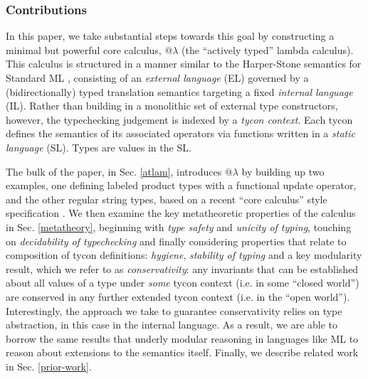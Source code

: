\documentclass{llncs}
\begin{document}
\vspace{-10px}
\subsubsection{Contributions} In this paper, we take substantial steps towards this goal by  constructing a minimal but powerful core calculus, @$\lambda$ (the ``actively typed'' lambda calculus). %
This calculus is structured in a manner similar to the Harper-Stone semantics for Standard ML \cite{Harper00atype-theoretic}, consisting of an \emph{external language} (EL) governed by a {(bidirectionally) typed translation semantics} targeting a fixed \emph{internal language} (IL). 
Rather than building in a monolithic set of external type constructors, however, the typechecking judgement is indexed by a \emph{tycon context}. Each tycon defines the semantics of its associated operators via functions written in a \emph{static language} (SL). Types are values in the SL.%

The bulk of the paper, in Sec. \ref{atlam}, introduces @$\lambda$ by building up two examples, one defining labeled product types with a functional update operator,  and the other regular string types, based on a recent ``core calculus'' style specification \cite{sanitation-psp14}.  We then examine the key metatheoretic properties of the calculus in Sec. \ref{metatheory}, beginning with \emph{type safety} and \emph{unicity of typing}, touching on  \emph{decidability of typechecking} and finally considering properties that relate to composition of tycon definitions: \emph{hygiene}, \emph{stability of typing} and a key modularity result, which we refer to as  \emph{conservativity}: any invariants that can be established about all values of a type under \emph{some} tycon context (i.e. in some  ``closed world'') are conserved in any further extended tycon context (i.e. in the ``open world''). Interestingly, the approach we take to guarantee conservativity relies on type abstraction, in this case in the internal language. As a result, we are able to borrow the same results that underly modular reasoning in languages like ML to reason about extensions to the semantics itself. Finally, we describe  related work in Sec. \ref{prior-work}.
\end{document}
